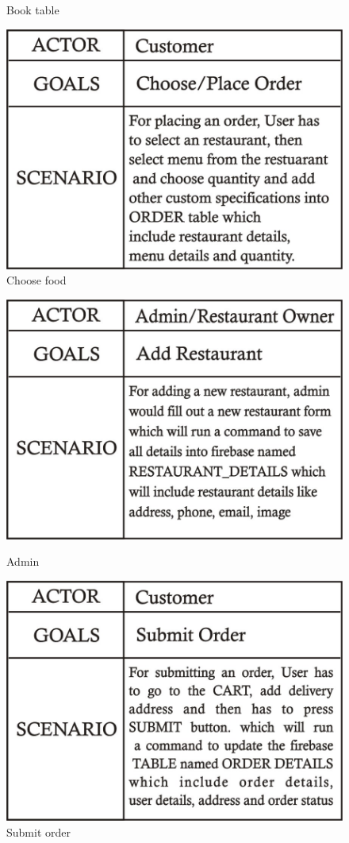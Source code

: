\documentclass[12pt]{article}
\begin{document}
\begin{figure}
\caption{Book table}
\includegraphics[scale=0.4]{choose.jpeg}
\caption{Choose food}
\end{figure}
\begin{figure}
\centering
\includegraphics[scale=0.4]{admin.jpeg}
\caption{Admin}
\includegraphics[scale=0.4]{submit.jpeg}
\caption{Submit order}

\end{figure}
\end{document}
